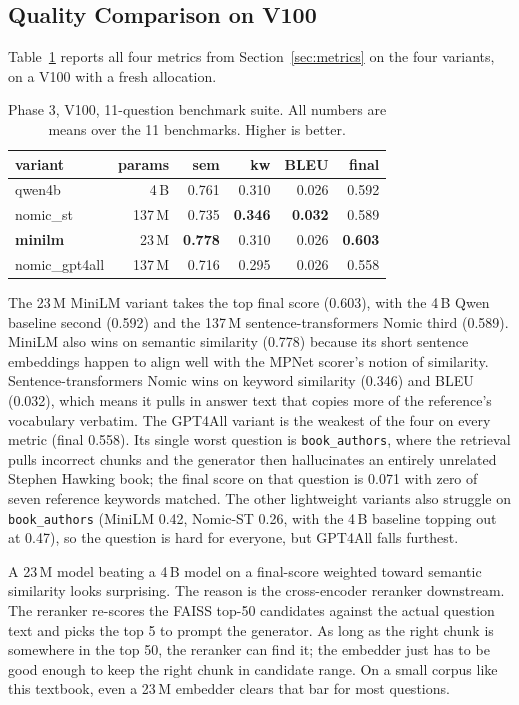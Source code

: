 \documentclass[sigconf]{acmart}
\begin{document}
\subsection{Quality Comparison on V100}

Table~\ref{tab:phase3-v100} reports all four metrics from
Section~\ref{sec:metrics} on the four variants, on a V100 with a fresh
allocation.

\begin{table}[h]
\caption{Phase 3, V100, 11-question benchmark suite. All numbers
are means over the 11 benchmarks. Higher is better.}
\label{tab:phase3-v100}
\begin{tabular}{lrrrrr}
\toprule
variant & params & sem & kw & BLEU & final \\
\midrule
qwen4b              & 4\,B   & 0.761 & 0.310 & 0.026 & 0.592 \\
nomic\_st           & 137\,M & 0.735 & \textbf{0.346} & \textbf{0.032} & 0.589 \\
\textbf{minilm}     & 23\,M  & \textbf{0.778} & 0.310 & 0.026 & \textbf{0.603} \\
nomic\_gpt4all      & 137\,M & 0.716 & 0.295 & 0.026 & 0.558 \\
\bottomrule
\end{tabular}
\end{table}

The 23\,M MiniLM variant takes the top final score (0.603), with the
4\,B Qwen baseline second (0.592) and the 137\,M sentence-transformers
Nomic third (0.589). MiniLM also wins on semantic similarity (0.778)
because its short sentence embeddings happen to align well with the
MPNet scorer's notion of similarity. Sentence-transformers Nomic wins
on keyword similarity (0.346) and BLEU (0.032), which means it pulls
in answer text that copies more of the reference's vocabulary
verbatim. The GPT4All variant is the weakest of the four on every
metric (final 0.558). Its single worst question is
\texttt{book\_authors}, where the retrieval pulls incorrect chunks and the generator then hallucinates an entirely
unrelated Stephen Hawking book; the final score on that question is
0.071 with zero of seven reference keywords matched. The other
lightweight variants also struggle on \texttt{book\_authors} (MiniLM
0.42, Nomic-ST 0.26, with the 4\,B baseline topping out at 0.47), so
the question is hard for everyone, but GPT4All falls furthest.

A 23\,M model beating a 4\,B model on a final-score weighted toward
semantic similarity looks surprising. The reason is the cross-encoder
reranker downstream. The reranker re-scores the FAISS top-50
candidates against the actual question text and picks the top 5 to
prompt the generator. As long as the right chunk is somewhere in the
top 50, the reranker can find it; the embedder just has to be good
enough to keep the right chunk in candidate range. On a small corpus
like this textbook, even a 23\,M embedder clears that bar for most
questions.
\end{document}
